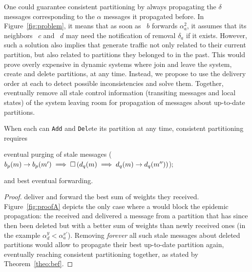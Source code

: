 One could guarantee consistent partitioning by always propagating the
$\delta$ messages corresponding to the $\alpha$ messages it propagated
before. In Figure~\ref{fig:problem}, it means that as soon as
\Process~$b$ forwards $\alpha_a^2$, it assumes that its neighbors
\Process~$c$ and \Process~$d$ may need the notification of removal
$\delta_a$ if it exists. However, such a solution also implies that
\processes generate traffic not only related to their current
partition, but also related to partitions they belonged to in the
past. This would prove overly expensive in dynamic systems where
\processes join and leave the system, create and delete partitions, at
any time.  Instead, we propose to use the delivery order at each
\process to detect possible inconsistencies and solve them. Together,
\processes eventually remove all stale control information (transiting
messages and local states) of the system leaving room for propagation
of messages about up-to-date partitions.

\begin{theorem}
%
When each \process can \texttt{Add} and \texttt{Del}ete its partition
at any time, consistent partitioning requires
\begin{inparaenum}[(i)]
\item eventual purging of stale messages ($b_p(m) \rightarrow b_p(m')
  \implies \square\, (d_q(m) \implies d_q(m) \rightarrow
  d_q(m''))$);
\item and best eventual forwarding.
\end{inparaenum}
\end{theorem}

\begin{proof}
  \Processes deliver and forward the best sum of weights they
  received. Figure~\ref{fig:proofA} depicts the only case where a
  \process would block the epidemic propagation: the \process received
  and delivered a message from a partition that has since then been
  deleted but with a better sum of weights than newly received ones
  (in the example $\alpha_d^y < \alpha_a^{x'}$). Removing
  \emph{forever} all such stale messages about deleted partitions
  would allow \processes to propagate their best up-to-date partition
  again, eventually reaching consistent partitioning together, as
  stated by Theorem~\ref{theo:bef}.
\end{proof}



